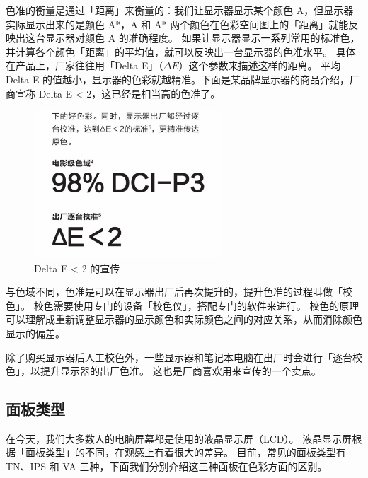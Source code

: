 色准的衡量是通过「距离」来衡量的：我们让显示器显示某个颜色 A，但显示器实际显示出来的是颜色 A*，A 和 A* 两个颜色在色彩空间图上的「距离」就能反映出这台显示器对颜色 A 的准确程度。
如果让显示器显示一系列常用的标准色，并计算各个颜色「距离」的平均值，就可以反映出一台显示器的色准水平。
具体在产品上，厂家往往用「Delta E」（$\Delta E$）这个参数来描述这样的距离。
平均 Delta E 的值越小，显示器的色彩就越精准。下面是某品牌显示器的商品介绍，厂商宣称 Delta E < 2，这已经是相当高的色准了。

\begin{figure}[htb!]
  \centering
  \includegraphics[width=7cm]{assets/Delta_E_below_2.jpg}
  \caption{Delta E < 2 的宣传}
  \label{Delta_E_below_2}
\end{figure}

与色域不同，色准是可以在显示器出厂后再次提升的，提升色准的过程叫做「校色」。
校色需要使用专门的设备「校色仪」，搭配专门的软件来进行。
校色的原理可以理解成重新调整显示器的显示颜色和实际颜色之间的对应关系，从而消除颜色显示的偏差。

除了购买显示器后人工校色外，一些显示器和笔记本电脑在出厂时会进行「逐台校色」，以提升显示器的出厂色准。
这也是厂商喜欢用来宣传的一个卖点。

\subsection{面板类型}

在今天，我们大多数人的电脑屏幕都是使用的液晶显示屏（LCD）。
液晶显示屏根据「面板类型」的不同，在观感上有着很大的差异。
目前，常见的面板类型有 TN、IPS 和 VA 三种，下面我们分别介绍这三种面板在色彩方面的区别。

